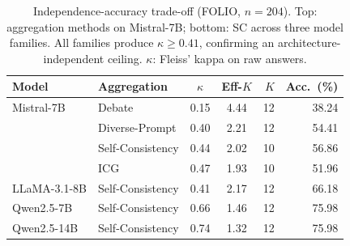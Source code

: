 \begin{table}[t]
\centering
\small
\caption{Independence-accuracy trade-off (FOLIO, $n = 204$). Top: aggregation methods on Mistral-7B; bottom: SC across three model families. All families produce $\kappa \geq 0.41$, confirming an architecture-independent ceiling. $\kappa$: Fleiss' kappa on raw answers.}
\label{tab:kappa_generalization}
\setlength{\tabcolsep}{3.5pt}
\begin{tabular}{@{}llccrr@{}}
\toprule
Model & Aggregation & $\kappa$ & Eff-$K$ & $K$ & Acc.\ (\%) \\
\midrule
Mistral-7B & Debate & 0.15 & 4.44 & 12 & 38.24 \\
& Diverse-Prompt & 0.40 & 2.21 & 12 & 54.41 \\
& Self-Consistency & 0.44 & 2.02 & 10 & 56.86 \\
& ICG & 0.47 & 1.93 & 10 & 51.96 \\
\addlinespace
LLaMA-3.1-8B & Self-Consistency & 0.41 & 2.17 & 12 & 66.18 \\
Qwen2.5-7B & Self-Consistency & 0.66 & 1.46 & 12 & 75.98 \\
Qwen2.5-14B & Self-Consistency & 0.74 & 1.32 & 12 & 75.98 \\
\bottomrule
\end{tabular}
\end{table}
